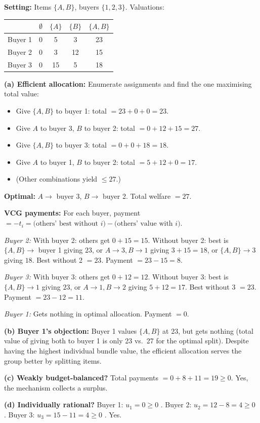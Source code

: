 \begin{exbox}
\textbf{Setting:} Items $\{A, B\}$, buyers $\{1, 2, 3\}$. Valuations:

\begin{center}
\begin{tabular}{lcccc}
\toprule
       & $\emptyset$ & $\{A\}$ & $\{B\}$ & $\{A,B\}$ \\
\midrule
Buyer 1 & 0 & 5  & 3  & 23 \\
Buyer 2 & 0 & 3  & 12 & 15 \\
Buyer 3 & 0 & 15 & 5  & 18 \\
\bottomrule
\end{tabular}
\end{center}

\textbf{(a) Efficient allocation:} Enumerate assignments and find the one maximising total value:
\begin{itemize}
  \item Give $\{A,B\}$ to buyer 1: total $= 23 + 0 + 0 = 23$.
  \item Give $A$ to buyer 3, $B$ to buyer 2: total $= 0 + 12 + 15 = 27$.
  \item Give $\{A,B\}$ to buyer 3: total $= 0 + 0 + 18 = 18$.
  \item Give $A$ to buyer 1, $B$ to buyer 2: total $= 5 + 12 + 0 = 17$.
  \item (Other combinations yield $\leq 27$.)
\end{itemize}

\textbf{Optimal:} $A \to$ buyer 3, $B \to$ buyer 2. Total welfare $= 27$.

\textbf{VCG payments:} For each buyer, payment $= -t_i = \text{(others' best without } i\text{)} - \text{(others' value with } i\text{)}$.

\emph{Buyer 2:} With buyer 2: others get $0 + 15 = 15$. Without buyer 2: best is $\{A,B\} \to$ buyer 1 giving $23$, or $A \to 3, B \to 1$ giving $3 + 15 = 18$, or $\{A,B\} \to 3$ giving $18$. Best without 2 $= 23$. Payment $= 23 - 15 = 8$.

\emph{Buyer 3:} With buyer 3: others get $0 + 12 = 12$. Without buyer 3: best is $\{A,B\} \to 1$ giving $23$, or $A \to 1, B \to 2$ giving $5 + 12 = 17$. Best without 3 $= 23$. Payment $= 23 - 12 = 11$.

\emph{Buyer 1:} Gets nothing in optimal allocation. Payment $= 0$.

\textbf{(b) Buyer 1's objection:} Buyer 1 values $\{A,B\}$ at 23, but gets nothing (total value of giving both to buyer 1 is only 23 vs.\ 27 for the optimal split). Despite having the highest individual bundle value, the efficient allocation serves the group better by splitting items.

\textbf{(c) Weakly budget-balanced?} Total payments $= 0 + 8 + 11 = 19 \geq 0$. Yes, the mechanism collects a surplus. \checkmark

\textbf{(d) Individually rational?} Buyer 1: $u_1 = 0 \geq 0$ \checkmark. Buyer 2: $u_2 = 12 - 8 = 4 \geq 0$ \checkmark. Buyer 3: $u_3 = 15 - 11 = 4 \geq 0$ \checkmark. Yes. \checkmark
\end{exbox}

